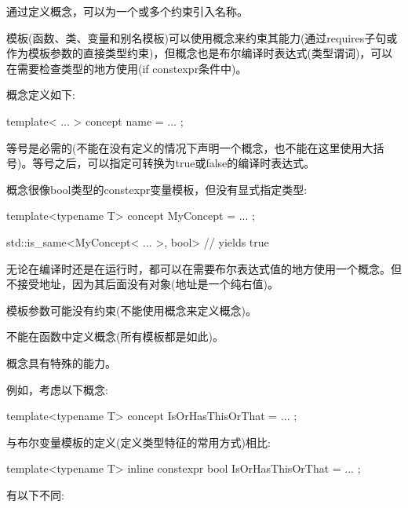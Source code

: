 
通过定义概念，可以为一个或多个约束引入名称。

模板(函数、类、变量和别名模板)可以使用概念来约束其能力(通过requires子句或作为模板参数的直接类型约束)，但概念也是布尔编译时表达式(类型谓词)，可以在需要检查类型的地方使用(if constexpr条件中)。


概念定义如下:

\begin{cpp}
template< ... >
concept name = ... ;
\end{cpp}

等号是必需的(不能在没有定义的情况下声明一个概念，也不能在这里使用大括号)。等号之后，可以指定可转换为true或false的编译时表达式。

概念很像bool类型的constexpr变量模板，但没有显式指定类型:

\begin{cpp}
template<typename T>
concept MyConcept = ... ;

std::is_same<MyConcept< ... >, bool> // yields true
\end{cpp}

无论在编译时还是在运行时，都可以在需要布尔表达式值的地方使用一个概念。但不接受地址，因为其后面没有对象(地址是一个纯右值)。

模板参数可能没有约束(不能使用概念来定义概念)。

不能在函数中定义概念(所有模板都是如此)。


概念具有特殊的能力。

例如，考虑以下概念:

\begin{cpp}
template<typename T>
concept IsOrHasThisOrThat = ... ;
\end{cpp}

与布尔变量模板的定义(定义类型特征的常用方式)相比:

\begin{cpp}
template<typename T>
inline constexpr bool IsOrHasThisOrThat = ... ;
\end{cpp}

有以下不同:

